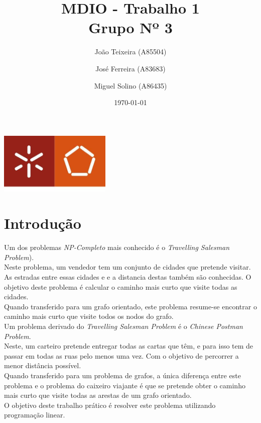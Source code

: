 \documentclass[a4paper]{report}
\begin{document}
\title{MDIO - Trabalho 1\\ 
\large Grupo Nº 3}
\author{João Teixeira (A85504) \and José Ferreira (A83683) \and Miguel Solino (A86435)}
\date{\today}

\begin{center}
    \begin{minipage}{0.75\linewidth}
        \centering
        \includegraphics[width=0.4\textwidth]{images/eng.jpeg}\par\vspace{1cm}
        \vspace{1.5cm}
        \href{https://www.uminho.pt/PT}
        {\color{black}{\scshape\LARGE Universidade do Minho}} \par
        \vspace{1cm}
        \href{https://www.di.uminho.pt/}
        {\color{black}{\scshape\Large Departamento de Informática}} \par
        \vspace{1.5cm}
        \maketitle
    \end{minipage}
\end{center}

\tableofcontents

\pagebreak

\chapter{Introdução}
Um dos problemas \textit{NP-Completo} mais conhecido é o \textit{Travelling
Salesman Problem}). \\
Neste problema, um vendedor tem um conjunto de cidades que pretende visitar. As
estradas entre essas cidades e e a distancia destas também são conhecidas. O
objetivo deste problema é calcular o caminho mais curto que visite todas as
cidades.\\
Quando transferido para um grafo orientado, este problema resume-se
encontrar o caminho mais curto que visite todos os nodos do grafo.\\
Um problema derivado do \textit{Travelling Salesman Problem} é o \textit{Chinese
Postman Problem}.\\
Neste, um carteiro pretende entregar todas as cartas que têm, e para isso tem de
passar em todas as ruas pelo menos uma vez. Com o objetivo de percorrer a menor
distância possível.\\
Quando transferido para um problema de grafos, a única diferença entre este
problema e o problema do caixeiro viajante é que se pretende obter o caminho
mais curto que visite todas as arestas de um grafo orientado. \\
O objetivo deste trabalho prático é resolver este problema
utilizando programação linear.
\end{document}
